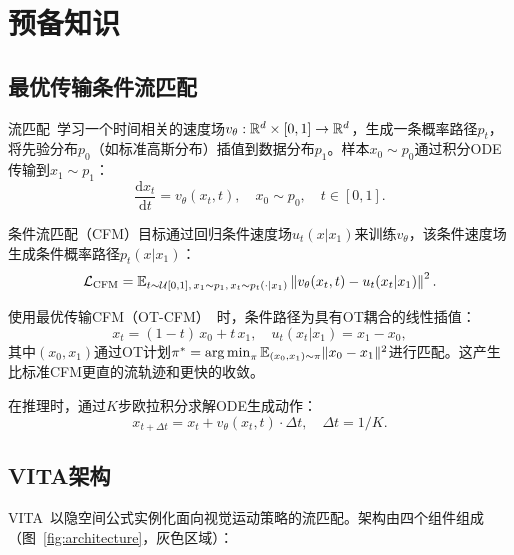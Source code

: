 \section{预备知识}
\label{sec:preliminaries}

\subsection{最优传输条件流匹配}

流匹配~\cite{lipman2023flow}学习一个时间相关的速度场$v_\theta: \mathbb{R}^d \times [0,1] \to \mathbb{R}^d$，生成一条概率路径$p_t$，将先验分布$p_0$（如标准高斯分布）插值到数据分布$p_1$。样本$x_0 \sim p_0$通过积分ODE传输到$x_1 \sim p_1$：
\begin{equation}
    \frac{\mathrm{d}x_t}{\mathrm{d}t} = v_\theta(x_t, t), \quad x_0 \sim p_0, \quad t \in [0, 1].
    \label{eq:flow_ode}
\end{equation}

条件流匹配（CFM）目标通过回归条件速度场$u_t(x | x_1)$来训练$v_\theta$，该条件速度场生成条件概率路径$p_t(x | x_1)$：
\begin{equation}
    \mathcal{L}_{\text{CFM}} = \mathbb{E}_{t \sim \mathcal{U}[0,1],\, x_1 \sim p_1,\, x_t \sim p_t(\cdot|x_1)} \left\| v_\theta(x_t, t) - u_t(x_t | x_1) \right\|^2.
    \label{eq:cfm_loss}
\end{equation}

使用最优传输CFM（OT-CFM）~\cite{tong2024improving}时，条件路径为具有OT耦合的线性插值：
\begin{equation}
    x_t = (1 - t)\, x_0 + t\, x_1, \quad u_t(x_t | x_1) = x_1 - x_0,
    \label{eq:ot_interpolation}
\end{equation}
其中$(x_0, x_1)$通过OT计划$\pi^* = \operatorname*{arg\,min}_\pi \mathbb{E}_{(x_0,x_1)\sim\pi}\|x_0 - x_1\|^2$进行匹配。这产生比标准CFM更直的流轨迹和更快的收敛。

在推理时，通过$K$步欧拉积分求解ODE生成动作：
\begin{equation}
    x_{t+\Delta t} = x_t + v_\theta(x_t, t) \cdot \Delta t, \quad \Delta t = 1/K.
    \label{eq:euler_sampling}
\end{equation}

\subsection{VITA架构}
\label{sec:vita_arch}

VITA~\cite{gao2026vita}以隐空间公式实例化面向视觉运动策略的流匹配。架构由四个组件组成（图~\ref{fig:architecture}，灰色区域）：

